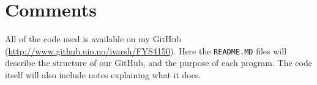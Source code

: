 \documentclass[%
 reprint,
nofootinbib,
aps,
]{revtex4-1}
\begin{document}
\section{Comments}
All of the code used is available on my GitHub (\url{http://www.github.uio.no/ivarsh/FYS4150}). Here the \texttt{README.MD} files will describe the structure of our GitHub, and the purpose of each program. The code itself will also include notes explaining what it does.

{}

\end{document}
